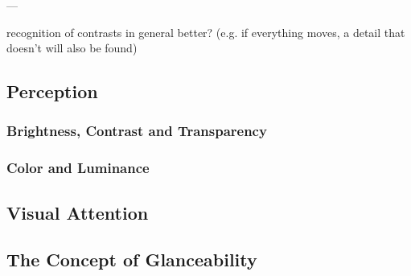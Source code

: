 ---

recognition of contrasts in general better? (e.g. if everything moves, a detail that doesn't will also be found)

\subsection{Perception}

\subsubsection{Brightness, Contrast and Transparency}
\subsubsection{Color and Luminance}

\subsection{Visual Attention}

\subsection{The Concept of Glanceability}